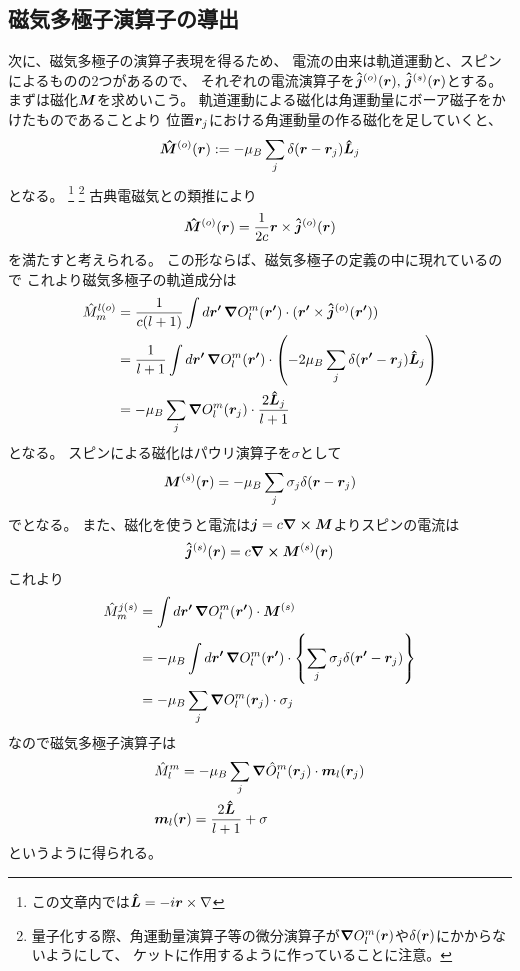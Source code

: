 \documentclass[../../master.tex]{subfiles}
\begin{document}
\subsection*{磁気多極子演算子の導出}
次に、磁気多極子の演算子表現を得るため、
電流の由来は軌道運動と、スピンによるものの2つがあるので、
それぞれの電流演算子を\(\vb*{\hat{j}}^{(o)}(\vb*{r}),\,\vb*{\hat{j}}^{(s)}(\vb*{r})\)とする。
まずは磁化\(\vb*{M}\)を求めいこう。
軌道運動による磁化は角運動量にボーア磁子をかけたものであることより
位置\(\vb*{r}_j\)における角運動量の作る磁化を足していくと、
\begin{equation}
    \vb*{\hat{M}}^{(o)}(\vb*{r}) := -\mu_B \sum_{j} \delta(\vb*{r}-\vb*{r}_j) \vb*{\hat{L}}_j
\end{equation}
となる。
\footnote{この文章内では\(\vb*{\hat{L}}=-i\vb*{r}\times \nabla\)}
\footnote{量子化する際、角運動量演算子等の微分演算子が\(\grad O_l^m(\vb*{r})\)や\(\delta(\vb*{r})\)にかからないようにして、
ケットに作用するように作っていることに注意。}
古典電磁気との類推により
\begin{equation}
    \vb*{\hat{M}}^{(o)}(\vb*{r}) = \frac{1}{2c}\vb*{r}\times \vb*{\hat{j}}^{(o)}(\vb*{r})
\end{equation}
を満たすと考えられる。
この形ならば、磁気多極子の定義の中に現れているので
これより磁気多極子の軌道成分は
\begin{align}
    \hat{M}_m^{l(o)}
    &= \frac{1}{c(l+1)} \int d\vb*{r'}\, \grad O_l^m(\vb*{r'})\cdot(\vb*{r'}\times \vb*{\hat{j}}^{(o)}(\vb*{r'}))\\
    &= \frac{1}{l+1} \int d\vb*{r'}\, \grad O_l^m(\vb*{r'})\cdot \qty(-2\mu_B \sum_j \delta(\vb*{r'}-\vb*{r}_j)\vb*{\hat{L}}_j)\\
    &= -\mu_B  \sum_j \grad O_l^m(\vb*{r}_j) \cdot \frac{2\vb*{\hat{L}}_j}{l+1}
\end{align}
となる。
スピンによる磁化はパウリ演算子を\(\sigma\)として
\begin{equation}
    \vb*{M}^{(s)}(\vb*{r}) = -\mu_B \sum_j \sigma_j \delta(\vb*{r}-\vb*{r}_j)
\end{equation}
でとなる。
また、磁化を使うと電流は\(\vb*{j}=c\curl\vb*{M}\)よりスピンの電流は
\begin{equation}
    \vb*{\hat{j}}^{(s)}(\vb*{r}) = c \curl \vb*{M}^{(s)}(\vb*{r})
\end{equation}
これより
\begin{align}
    \hat{M}_m^{j(s)}
    &= \int d\vb*{r'}\,\grad O_l^m(\vb*{r'}) \cdot \vb*{M}^{(s)} \\
    &= -\mu_B  \int d\vb*{r'}\,\grad O_l^m(\vb*{r'})\cdot\qty{\sum_j \sigma_j \delta(\vb*{r'}-\vb*{r}_j)} \\
    &= -\mu_B  \sum_{j}  \grad O_l^m(\vb*{r}_j)\cdot \sigma_j
\end{align}
なので磁気多極子演算子は
\begin{align}
    &\hat{M}_l^m = -\mu_B  \sum_j \grad \hat{O}_l^m(\vb*{r}_j) \cdot \vb*{m}_l(\vb*{r}_j)\\
    &\vb*{m}_l(\vb*{r}) = \frac{2\vb*{\hat{L}}}{l+1}+\sigma
\end{align}
というように得られる。
\end{document}

